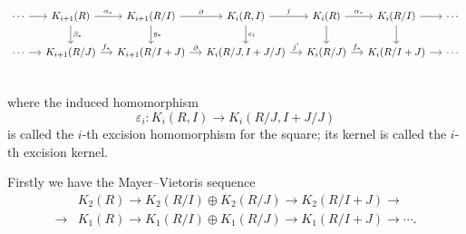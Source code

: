 \begin{equation}
\label{cdrelativeladder}
\begin{tikzcd}[column sep=small]
		\cdots  \ar[r]& K_{i+1}(R)\ar[r,"\alpha_*"] \ar[d,"\beta_*"]& K_{i+1}(R/I) \ar[r,"\partial"] \ar[d,"g_*"] &K_{i}(R,I) \ar[r,"j"] \ar[d,"\varepsilon_i"] &K_{i}(R) \ar[r,"\alpha_*"] \ar[d] & K_{i}(R/I) \ar[r] \ar[d] & \cdots\\
		\cdots  \ar[r]& K_{i+1}(R/J)\ar[r,"f_*"] & K_{i+1}(R/I+J) \ar[r,"\partial"]  &K_{i}(R/J,I+J/J) \ar[r,"j'"]  &K_{i}(R/J) \ar[r,"f_*"]  & K_{i}(R/I+J) \ar[r]  & \cdots\\
	\end{tikzcd}
\end{equation}

	where the induced homomorphism 
	\[\varepsilon_i \colon K_i(R,I) \longrightarrow K_i(R/J,I+J/J)\]
is called the $i$-th excision homomorphism for the square; its kernel is called the $i$-th excision kernel.

	Firstly we have the Mayer–Vietoris sequence
	\begin{align*}
	&K_2(R)\longrightarrow K_2(R/I)\oplus K_2(R/J)\longrightarrow K_2(R/I+J) \longrightarrow \\
	\longrightarrow &K_1(R) \longrightarrow K_1(R/I)\oplus K_1(R/J)\longrightarrow K_1(R/I+J)\longrightarrow \cdots.
	\end{align*}
	
